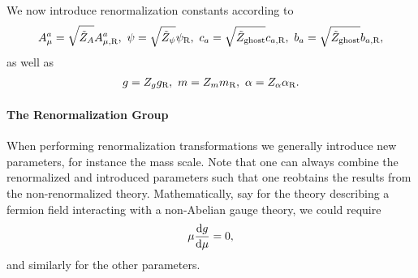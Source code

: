 We now introduce renormalization constants according to
\begin{align*}
	A_{\mu}^{a} = \sqrt{\tilde{Z}_{A}}A_{\mu, \text{R}}^{a},\ \psi = \sqrt{\tilde{Z}_{\psi}}\psi_{\text{R}},\ c_{a} = \sqrt{\tilde{Z}_{\text{ghost}}}c_{a, \text{R}},\ b_{a} = \sqrt{\tilde{Z}_{\text{ghost}}}b_{a, \text{R}},
\end{align*}
as well as 
\begin{align*}
	g = Z_{g}g_{\text{R}},\ m = Z_{m}m_{\text{R}},\ \alpha = Z_{\alpha}\alpha_{\text{R}}.
\end{align*}

\paragraph{The Renormalization Group}
When performing renormalization transformations we generally introduce new parameters, for instance the mass scale. Note that one can always combine the renormalized and introduced parameters such that one reobtains the results from the non-renormalized theory. Mathematically, say for the theory describing a fermion field interacting with a non-Abelian gauge theory, we could require
\begin{align*}
	\mu\dv{g}{\mu} = 0,
\end{align*}
and similarly for the other parameters.